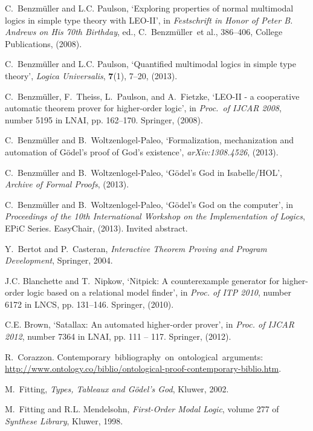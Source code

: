 \documentclass{ecai2014}
\begin{document}
{\begin{thebibliography}{10}
C.~Benzm{\"u}ller and L.C. Paulson, `Exploring properties of normal multimodal
  logics in simple type theory with {LEO-II}', in {\em {Festschrift in Honor of
  {Peter B. Andrews} on His 70th Birthday}}, ed., C.~Benzm{\"u}ller~et al.,
  386--406, College Publications, (2008).

C.~Benzm{\"u}ller and L.C. Paulson, `Quantified multimodal logics in simple
  type theory', {\em Logica Universalis}, {\bf 7}(1),  7--20, (2013).

C.~Benzm{\"u}ller, F.~Theiss, L.~Paulson, and A.~Fietzke, `{LEO-II} - a
  cooperative automatic theorem prover for higher-order logic', in {\em
  Proc.~of IJCAR 2008}, number 5195 in LNAI, pp. 162--170. Springer, (2008).

C.~Benzm{\"u}ller and B.~Woltzenlogel-Paleo, `Formalization, mechanization and
  automation of {G{\"o}del's} proof of {God's} existence', {\em
  arXiv:1308.4526}, (2013).

C.~Benzm\"uller and B.~Woltzenlogel-Paleo, `{G{\"o}del's God in Isabelle/HOL}',
  {\em Archive of Formal Proofs}, (2013).

C.~Benzm\"uller and B.~Woltzenlogel-Paleo, `G\"odel's {God} on the computer',
  in {\em Proceedings of the 10th International Workshop on the Implementation
  of Logics}, EPiC Series. EasyChair, (2013).
\newblock Invited abstract.

Y.~Bertot and P.~Casteran, {\em {Interactive Theorem Proving and Program
  Development}}, Springer, 2004.

J.C. Blanchette and T.~Nipkow, `Nitpick: A counterexample generator for
  higher-order logic based on a relational model finder', in {\em Proc. of ITP
  2010}, number 6172 in LNCS, pp. 131--146. Springer, (2010).

C.E. Brown, `Satallax: An automated higher-order prover', in {\em Proc. of
  IJCAR 2012}, number 7364 in LNAI, pp. 111 -- 117. Springer, (2012).

R.~Corazzon.
\newblock Contemporary~bibliography~on~ontological~arguments: {\scriptsize
  \url{http://www.ontology.co/biblio/ontological-proof-contemporary-biblio.htm}}.

M.~Fitting, {\em Types, Tableaux and G\"odel's God}, Kluwer, 2002.

M.~Fitting and R.L. Mendelsohn, {\em First-Order Modal Logic}, volume 277 of
  {\em Synthese Library}, Kluwer, 1998.


\end{thebibliography}}
\end{document}
